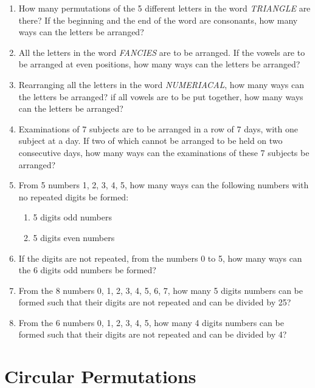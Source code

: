 \documentclass{report}
\begin{document}
\begin{multicols}{2}
\begin{enumerate}
    \item How many permutations of the 5 different letters in the word \textit{TRIANGLE}
          are there? If the beginning and the end of the word are consonants, how many
          ways can the letters be arranged?

    \item All the letters in the word \textit{FANCIES} are to be arranged. If the vowels
          are to be arranged at even positions, how many ways can the letters be
          arranged?

    \item Rearranging all the letters in the word \textit{NUMERIACAL}, how many ways can
          the letters be arranged? if all vowels are to be put together, how many ways
          can the letters be arranged?

    \item Examinations of 7 subjects are to be arranged in a row of 7 days, with one
          subject at a day. If two of which cannot be arranged to be held on two
          consecutive days, how many ways can the examinations of these 7 subjects be
          arranged?

    \item From 5 numbers 1, 2, 3, 4, 5, how many ways can the following numbers with no
          repeated digits be formed:
          \begin{enumerate}
            \item 5 digits odd numbers
            \item 5 digits even numbers
          \end{enumerate}

    \item If the digits are not repeated, from the numbers 0 to 5, how many ways can the
          6 digits odd numbers be formed?

    \item From the 8 numbers 0, 1, 2, 3, 4, 5, 6, 7, how many 5 digits numbers can be
          formed such that their digits are not repeated and can be divided by 25?

    \item From the 6 numbers 0, 1, 2, 3, 4, 5, how many 4 digits numbers can be formed
          such that their digits are not repeated and can be divided by 4?
  \end{enumerate}

  \section{Circular Permutations}


\end{multicols}
\end{document}
